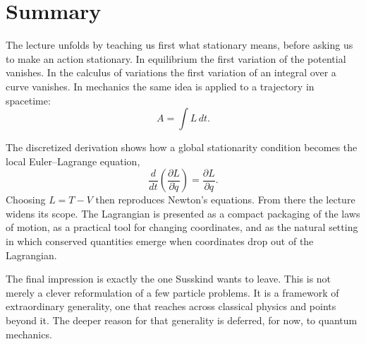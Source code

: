 \section{Summary}

The lecture unfolds by teaching us first what stationary means, before asking us to make an action stationary. In equilibrium the first variation of the potential vanishes. In the calculus of variations the first variation of an integral over a curve vanishes. In mechanics the same idea is applied to a trajectory in spacetime:
\[
A=\int L\,dt.
\]

The discretized derivation shows how a global stationarity condition becomes the local Euler--Lagrange equation,
\[
\frac{d}{dt}\!\left(\frac{\partial L}{\partial \dot q}\right)=\frac{\partial L}{\partial q}.
\]
Choosing \(L=T-V\) then reproduces Newton's equations. From there the lecture widens its scope. The Lagrangian is presented as a compact packaging of the laws of motion, as a practical tool for changing coordinates, and as the natural setting in which conserved quantities emerge when coordinates drop out of the Lagrangian.

The final impression is exactly the one Susskind wants to leave. This is not merely a clever reformulation of a few particle problems. It is a framework of extraordinary generality, one that reaches across classical physics and points beyond it. The deeper reason for that generality is deferred, for now, to quantum mechanics.
